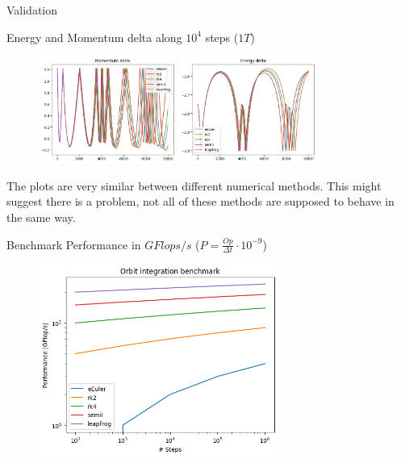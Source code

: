 \documentclass{beamer}
\begin{document}
\begin{frame}{Validation}

	Energy and Momentum delta along $10^4$ steps ($1 T$)
\begin{figure}
\centering
    \includegraphics[width=0.4\textwidth]{../plots/plot_M.png}
    \includegraphics[width=0.4\textwidth]{../plots/plot_E.png}
    \label{fig:question}
\end{figure}
The plots are very similar between different numerical methods.
This might suggest there is a problem, not all of these methods are supposed to behave in the same way.
\end{frame}

\begin{frame}{Benchmark}
Performance in $GFlops/s$ ($P = \frac{Op}{\Delta t} \cdot 10^{-9}$)
\begin{figure}
	\centering
	\includegraphics[width = 0.7\textwidth]{../plots/benchmark_plot.png}
\end{figure}
\end{frame}
\end{document}
